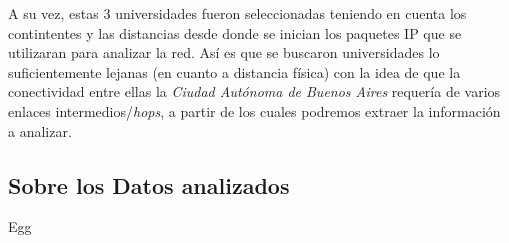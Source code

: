 \par A su vez, estas 3 universidades fueron seleccionadas teniendo en cuenta
los contintentes y las distancias desde donde se inician los paquetes IP que
se utilizaran para analizar la red. As\'i es que se buscaron universidades
lo suficientemente lejanas (en cuanto a distancia f\'isica) con la idea de que
la conectividad entre ellas la \textit{Ciudad Aut\'onoma de Buenos Aires}
requer\'ia de varios enlaces intermedios/\textit{hops}, a partir de los cuales
podremos extraer la informaci\'on a analizar.


\subsection*{Sobre los Datos analizados}
\par Egg
